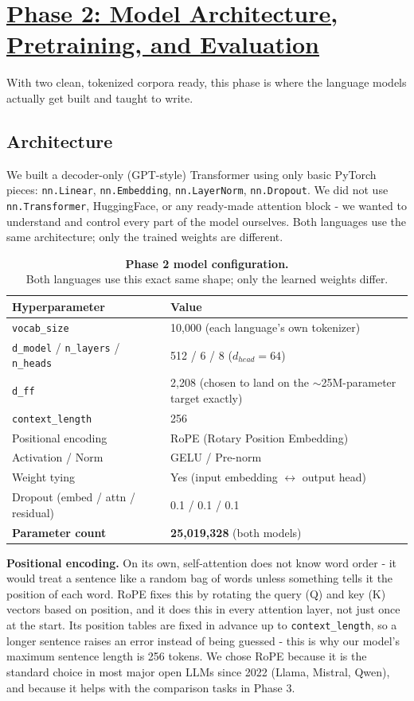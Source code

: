 \documentclass[11pt]{article}
\newcommand{\figcap}[2]{\textbf{#1}\\[2pt]#2}
\begin{document}
\FloatBarrier

\section{\underline{Phase 2: Model Architecture, Pretraining, and Evaluation}}

With two clean, tokenized corpora ready, this phase is where the language models actually get built and taught to write.

\subsection{Architecture}

We built a decoder-only (GPT-style) Transformer using only basic PyTorch pieces: \texttt{nn.Linear}, \texttt{nn.Embedding}, \texttt{nn.LayerNorm}, \texttt{nn.Dropout}. We did not use \texttt{nn.Transformer}, HuggingFace, or any ready-made attention block - we wanted to understand and control every part of the model ourselves. Both languages use the same architecture; only the trained weights are different.

\begin{table}[h]
\centering \small
\begin{tabular}{ll}
\toprule
Hyperparameter & Value \\
\midrule
\texttt{vocab\_size} & 10,000 (each language's own tokenizer) \\
\texttt{d\_model} / \texttt{n\_layers} / \texttt{n\_heads} & 512 / 6 / 8 ($d_{head}=64$) \\
\texttt{d\_ff} & 2,208 (chosen to land on the $\sim$25M-parameter target exactly) \\
\texttt{context\_length} & 256 \\
Positional encoding & RoPE (Rotary Position Embedding) \\
Activation / Norm & GELU / Pre-norm \\
Weight tying & Yes (input embedding $\leftrightarrow$ output head) \\
Dropout (embed / attn / residual) & 0.1 / 0.1 / 0.1 \\
\textbf{Parameter count} & \textbf{25,019,328} (both models) \\
\bottomrule
\end{tabular}
\caption{\figcap{Phase 2 model configuration.}{Both languages use this exact same shape; only the learned weights differ.}}
\end{table}

\textbf{Positional encoding.} On its own, self-attention does not know word order - it would treat a sentence like a random bag of words unless something tells it the position of each word. RoPE fixes this by rotating the query (Q) and key (K) vectors based on position, and it does this in every attention layer, not just once at the start. Its position tables are fixed in advance up to \texttt{context\_length}, so a longer sentence raises an error instead of being guessed - this is why our model's maximum sentence length is 256 tokens. We chose RoPE because it is the standard choice in most major open LLMs since 2022 (Llama, Mistral, Qwen), and because it helps with the comparison tasks in Phase 3.
\end{document}
